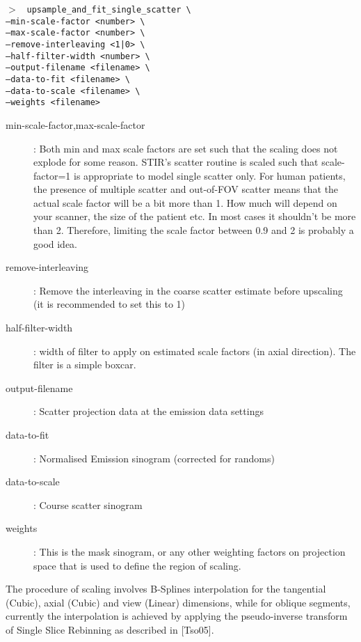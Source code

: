 \documentclass{article}
\newcommand{\cmdline}[1]{\par \noindent $>$ \texttt{#1}\par}
\begin{document}
\cmdline{%
upsample\_and\_fit\_single\_scatter \textbackslash \\
					--min-scale-factor <number> \textbackslash \\
					--max-scale-factor <number> \textbackslash \\
					--remove-interleaving <1|0> \textbackslash \\
					--half-filter-width <number> \textbackslash \\
					--output-filename <filename> \textbackslash \\
					--data-to-fit <filename> \textbackslash \\
					--data-to-scale <filename> \textbackslash \\
					--weights <filename>%
}
\begin{description}
\item[min-scale-factor,max-scale-factor]: Both min and max scale factors are set such that the scaling does not explode for some reason. 
STIR's scatter routine is scaled such that scale-factor=1 is appropriate to model single scatter only. 
For human patients, the presence of multiple scatter and out-of-FOV scatter means that the actual 
scale factor will be a bit more than 1. How much will depend
on your scanner, the size of the patient etc. In most cases it shouldn't be
more than 2. Therefore, limiting the scale factor between 0.9 and 2 is probably a good idea.
\item[remove-interleaving]: Remove the interleaving in the coarse scatter estimate before upscaling (it is recommended to set this to 1)
\item[half-filter-width]: width of filter to apply on estimated scale factors (in axial direction). The filter is a simple boxcar.
\item[output-filename]: Scatter projection data at the emission data settings
\item[data-to-fit]: Normalised Emission sinogram (corrected for randoms) 
\item[data-to-scale]: Course scatter sinogram 
\item[weights]: This is the mask sinogram, or any other weighting factors on projection space that is used to define the region of scaling. 
\end{description}
The procedure of scaling involves B-Splines interpolation for the tangential (Cubic), axial (Cubic) and
view (Linear) dimensions, while for oblique segments, currently the interpolation is achieved by applying the
pseudo-inverse transform of Single Slice Rebinning as described in [Tso05].
\end{document}
